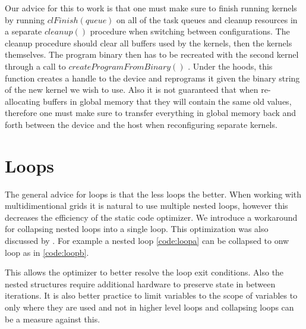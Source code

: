 Our advice for this to work is that one must make sure to finish running kernels by running $ clFinish(queue) $ on all of the task queues and cleanup resources in a separate $ cleanup()$ procedure when switching between configurations. The cleanup procedure should clear all buffers used by the kernels, then the kernels themselves. The program binary then has to be recreated with the second kernel through a call to $createProgramFromBinary()$ . Under the hoods, this function creates a handle to the device and reprograms it given the binary string of the new kernel we wish to use. Also it is not guaranteed that when re-allocating buffers in global memory that they will contain the same old values, therefore one must make sure to transfer everything in global memory back and forth between the device and the host when reconfiguring separate kernels.

\section{Loops}

The general advice for loops is that the less loops the better. When working with multidimentional grids it is natural to use multiple nested loops, however this decreases the efficiency of the static code optimizer. We introduce a workaround for collapsing nested loops into a single loop. This optimization was also discussed by \cite{2018combined}. For example a nested loop \ref{code:loopa} can be collapsed to onw loop as in \ref{code:loopb}.

\begin{minipage}{0.5\textwidth}
  
 \label{code:loopa}   
  
\end{minipage}%
\vspace{0pt}
\hspace{5pt}
\begin{minipage}{0.5\textwidth}
 
 \label{code:loopb} 
 
\end{minipage}

This allows the optimizer to better resolve the loop exit conditions. Also the nested structures require additional hardware to preserve state in between iterations. It is also better practice to limit variables to the scope of variables to only where they are used and not in higher level loops and collapsing loops can be a measure against this.


